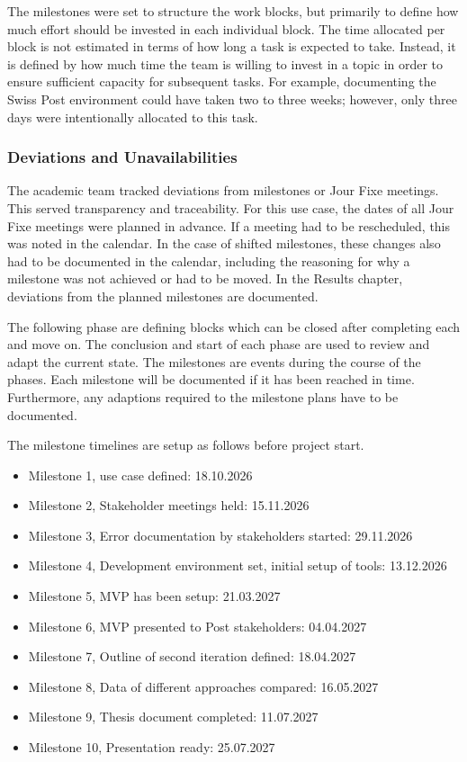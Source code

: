 The milestones were set to structure the work blocks, but primarily to define how much effort should be invested in each individual block. The time allocated per block is not estimated in terms of how long a task is expected to take. Instead, it is defined by how much time the team is willing to invest in a topic in order to ensure sufficient capacity for subsequent tasks. For example, documenting the Swiss Post environment could have taken two to three weeks; however, only three days were intentionally allocated to this task.

\subsubsection*{Deviations and Unavailabilities}
The academic team tracked deviations from milestones or Jour Fixe meetings. This served transparency and traceability. For this use case, the dates of all Jour Fixe meetings were planned in advance. If a meeting had to be rescheduled, this was noted in the calendar. In the case of shifted milestones, these changes also had to be documented in the calendar, including the reasoning for why a milestone was not achieved or had to be moved. In the Results chapter, deviations from the planned milestones are documented.











 

The following phase are defining blocks which can be closed after completing each and move on. The conclusion and start of each phase are used to review and adapt the current state.
The milestones are events during the course of the phases. Each milestone will be documented if it has been reached in time. Furthermore, any adaptions required to the milestone plans have to be documented.


The milestone timelines are setup as follows before project start.

\begin{itemize}
    \item Milestone 1, use case defined: 18.10.2026
    \item Milestone 2, Stakeholder meetings held: 15.11.2026
    \item Milestone 3, Error documentation by stakeholders started: 29.11.2026
    \item Milestone 4, Development environment set, initial setup of tools: 13.12.2026
    \item Milestone 5, MVP has been setup: 21.03.2027
    \item Milestone 6, MVP presented to Post stakeholders: 04.04.2027
    \item Milestone 7, Outline of second iteration defined: 18.04.2027
    \item Milestone 8, Data of different approaches compared: 16.05.2027
    \item Milestone 9, Thesis document completed: 11.07.2027
    \item Milestone 10, Presentation ready: 25.07.2027
\end{itemize}

